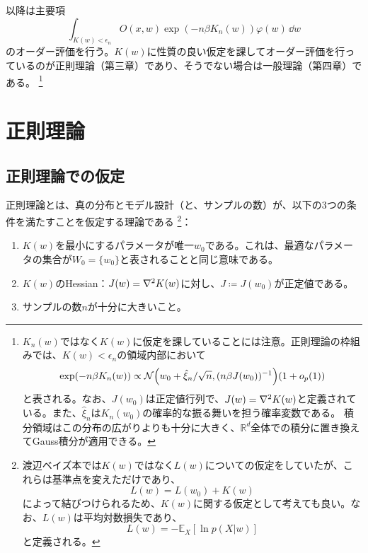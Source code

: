 \documentclass[dvipdfmx]{jsarticle}
\begin{document}
以降は主要項
\begin{equation}
    \int_{K(w)<\epsilon_n} O(x,w)\exp(-n\beta K_n(w))\varphi(w)\,\dd{w} 
\end{equation}
のオーダー評価を行う。$K(w)$に性質の良い仮定を課してオーダー評価を行っているのが正則理論（第三章）であり、そうでない場合は一般理論（第四章）である。
\footnote{
    $K_n(w)$ではなく$K(w)$に仮定を課していることには注意。正則理論の枠組みでは、$K(w) < \epsilon_n$の領域内部において
    \begin{equation}
        \exp(-n\beta K_n(w))\propto  \mathcal{N}\qty(w_0 + \hat{\xi}_n/\sqrt{n}, (n\beta J(w_0))^{-1})(1+o_p(1))
    \end{equation}
    と表される。なお、$J(w_0)$は正定値行列で、$J(w)=\laplacian{K(w)}$と定義されている。また、$\hat{\xi}_n$は$K_n(w_0)$の確率的な振る舞いを担う確率変数である。
    積分領域はこの分布の広がりよりも十分に大きく、$\mathbb{R}^d$全体での積分に置き換えてGauss積分が適用できる。
}

\section{正則理論}
\subsection{正則理論での仮定}
正則理論とは、真の分布とモデル設計（と、サンプルの数）が、以下の3つの条件を満たすことを仮定する理論である
\footnote{
    渡辺ベイズ本では$K(w)$ではなく$L(w)$についての仮定をしていたが、これらは基準点を変えただけであり、
    \begin{equation}
        L(w) = L(w_0) + K(w)
    \end{equation}
    によって結びつけられるため、$K(w)$に関する仮定として考えても良い。なお、$L(w)$は平均対数損失であり、
    \begin{equation}
        L(w) = -\mathbb{E}_X[\ln{p(X|w)}]
    \end{equation}
    と定義される。
}：
\begin{enumerate}
    \item $K(w)$を最小にするパラメータが唯一$w_0$である。これは、最適なパラメータの集合が$W_0=\{w_0\}$と表されることと同じ意味である。
    \item $K(w)$のHessian：$J(w)=\laplacian{K(w)}$に対し、$J\coloneqq J(w_0)$が正定値である。
    \item サンプルの数$n$が十分に大きいこと。
\end{enumerate}
\end{document}

